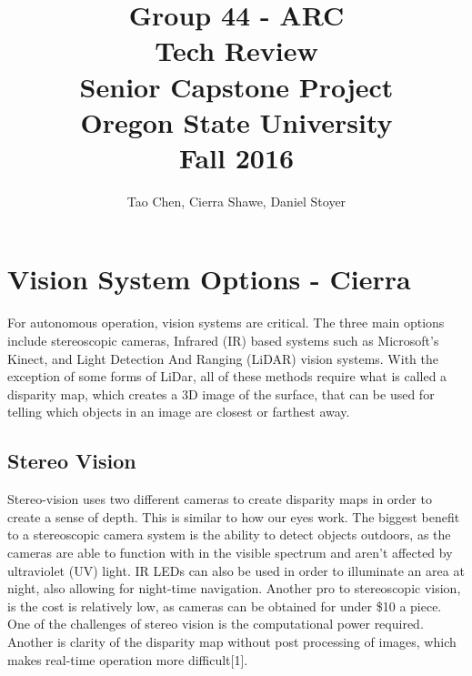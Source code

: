 \documentclass[compsoc,draftclsnofoot,onecolumn,10pt]{IEEEtran}
\begin{document}
\begin{titlepage}
\title{
Group 44 - ARC \\
Tech Review\\
\LARGE
Senior Capstone Project\\
Oregon State University\\
Fall 2016
}

\author{Tao Chen, Cierra Shawe, Daniel Stoyer}
\maketitle

\begin{abstract}

\end{abstract}

\thispagestyle{empty} %

\end{titlepage}
\newpage

\tableofcontents

\newpage

\section{Vision System Options - Cierra} %
For autonomous operation, vision systems are critical. 
The three main options include stereoscopic cameras, Infrared (IR) based systems such as Microsoft's Kinect, and Light Detection And Ranging (LiDAR) vision systems. 
With the exception of some forms of LiDar, all of these methods require what is called a disparity map, which creates a 3D image of the surface, that can be used for telling which objects in an image are closest or farthest away. 

\subsection{Stereo Vision}
Stereo-vision uses two different cameras to create disparity maps in order to create a sense of depth. 
This is similar to how our eyes work. 
The biggest benefit to a stereoscopic camera system is the ability to detect objects outdoors, as the cameras are able to function with in the visible spectrum and aren't affected by ultraviolet (UV) light. 
IR LEDs can also be used in order to illuminate an area at night, also allowing for night-time navigation. 
Another pro to stereoscopic vision, is the cost is relatively low, as cameras can be obtained for under \$10 a piece.  
One of the challenges of stereo vision is the computational power required. 
Another is clarity of the disparity map without post processing of images, which makes real-time operation more difficult[1]. 
\end{document}
